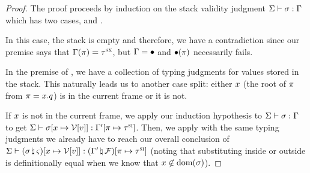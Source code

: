 \begin{proof}
  The proof proceeds by induction on the stack validity judgment
  $\Sigma \vdash \sigma : \Gamma$ which has two cases,
   and .

  \vspace{1em}
  \noindent \framebox[\textwidth]{
    \figuresize
    \begin{mathpar}
      \VStackEmpty
    \end{mathpar}
  }
  \vspace{1em}

  In this case, the stack is empty and therefore, we have a contradiction since
  our premise says that $\Gamma(\pi) = \tau^\textsc{sx}$, but
  $\Gamma = \bullet$ and $\bullet(\pi)$ necessarily fails.

  \vspace{1em}
  \noindent \framebox[\textwidth]{
    \figuresize
    \begin{mathpar}
      \VStack
    \end{mathpar}
  }
  \vspace{1em}

  In the premise of , we have a collection of typing
  judgments for values stored in the stack. This naturally leads us to another
  case split: either $x$ (the root of $\pi$ from $\pi =
  x . q$) is in the current frame or it is not.

  If $x$ is not in the current frame, we apply our induction hypothesis to
  $\Sigma \vdash \sigma : \Gamma$ to get
  $\Sigma \vdash 
    \sigma [x \mapsto \mathcal{V}[v]]
   : 
    \Gamma^\prime [\pi \mapsto \tau^\textsc{si}]
  $. Then, we apply  with the same typing judgments we
  already have to reach our overall conclusion of
  $\oxstorevalidity{\oxglobalctx}{
    \oxtupdate{
      (\oxnewframe{\oxvarctx^\prime}{\oxframe})
    }{\oxplace}{\oxsitype}
  }{
    \oxvupdate{
      (\oxnewframe{\oxstore}{\oxstackframe})
    }{\oxid}{\oxvaluectx[\oxvalue]}
  }$ (noting that substituting inside or outside is definitionally equal when
  we know that $x \not\in \textrm{dom}(\sigma)$).


\end{proof}
